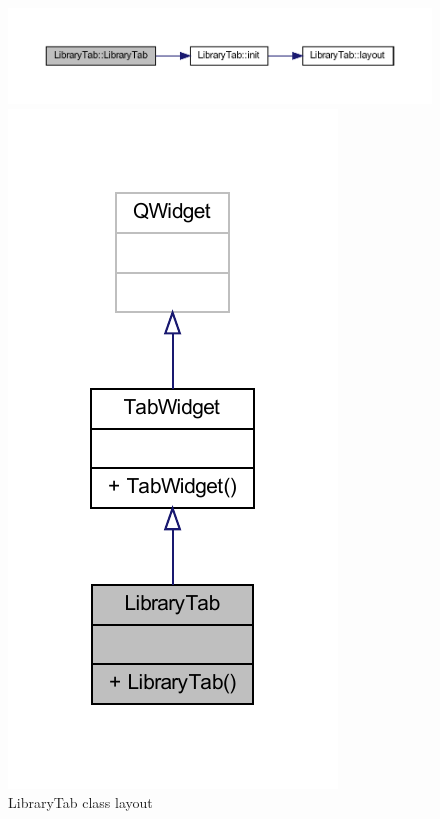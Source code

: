 \documentclass{article}
\begin{document}
\begin{figure}
    \begin{sideways}
        \centering
        \includegraphics[width=\textheight]{classPdfs/classLibraryTab_a928c981ca174c41d75e5296d4623d5a2_cgraph.pdf} 
    \end{sideways}
    \includegraphics[]{classPdfs/classLibraryTab.pdf}
    \caption{LibraryTab class layout} \label{fig:LibraryTab class layout}
\end{figure}
\end{document}
